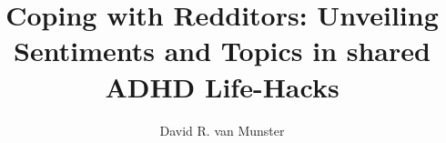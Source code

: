 \usepackage{booktabs}
\usepackage{url}
\usepackage{color}
\usepackage{enumitem}


\acmDOI{}

\acmISBN{}

\acmYear{}
\copyrightyear{}

\acmPrice{}

\title{Coping with Redditors: Unveiling Sentiments and Topics in shared ADHD Life-Hacks}


\author{David R. van Munster}

\renewcommand{\shortauthors}{David van Munster}
\renewcommand{\shorttitle}{Coping with strangers}
